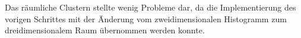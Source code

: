 Das räumliche Clustern stellte wenig Probleme dar, da die Implementierung des vorigen Schrittes mit der Änderung vom zweidimensionalen Histogramm zum dreidimensionalem Raum übernommen werden konnte.































































